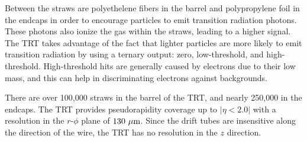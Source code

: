 Between the straws are polyethelene fibers in the barrel and polypropylene foil in the endcaps in order to encourage particles to emit transition radiation photons.
These photons also ionize the gas within the straws, leading to a higher signal.
The TRT takes advantage of the fact that lighter particles are more likely to emit transition radiation by using a ternary output: zero, low-threshold, and high-threshold.
High-threshold hits are generally caused by electrons due to their low mass, and this can help in discriminating electrons against backgrounds. 

There are over 100,000 straws in the barrel of the TRT, and nearly 250,000 in the endcaps.
The TRT provides pseudorapidity coverage up to $|\eta < 2.0|$ with a resolution in the $r$-$\phi$ plane of $130~\mu\textrm{m}$.
Since the drift tubes are insensitive along the direction of the wire, the TRT has no resolution in the $z$ direction.
